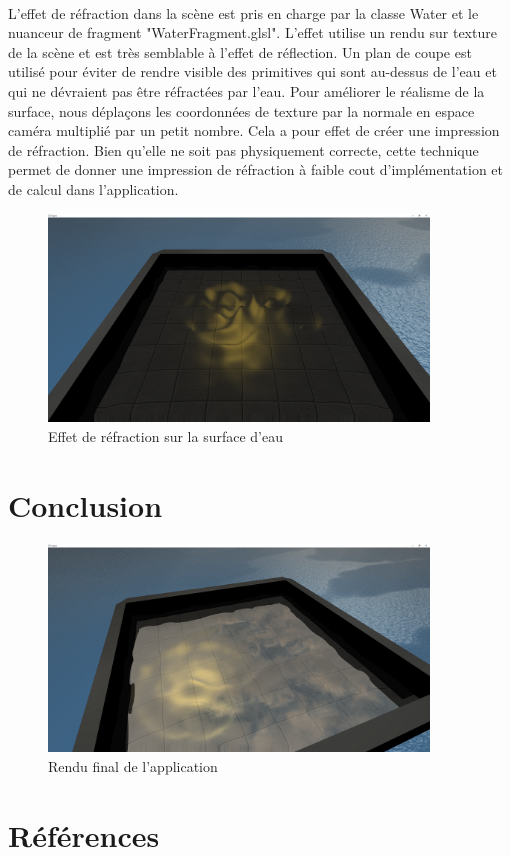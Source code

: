 \documentclass[a4paper, 12pt]{article} %
\begin{document}
	\paragraph{}
	L'effet de réfraction dans la scène est pris en charge par la classe Water et le nuanceur de fragment "WaterFragment.glsl". L'effet utilise un rendu sur 
	texture de la scène et est très semblable à l'effet de réflection. Un plan de coupe est utilisé pour éviter de rendre visible des primitives qui sont au-dessus
	de l'eau et qui ne dévraient pas être réfractées par l'eau. Pour améliorer le réalisme de la surface, nous déplaçons les coordonnées de texture par la normale 
	en espace caméra multiplié par un petit nombre. Cela a pour effet de créer une impression de réfraction. Bien qu'elle ne soit pas physiquement correcte, cette
	technique permet de donner une impression de réfraction à faible cout d'implémentation et de calcul dans l'application.
\begin{figure}
	\centering
	\includegraphics[width=0.9\textwidth]{./PhotoRapport/Refraction.png}
	\caption{Effet de réfraction sur la surface d'eau}
	\label{Refractopm}
\end{figure}
\section{Conclusion}
\begin{figure}
	\centering
	\includegraphics[width=0.9\textwidth]{./PhotoRapport/EffetFinal.png}
	\caption{Rendu final de l'application}
	\label{EffetFinal}
\end{figure}
\section{Références}
\end{document}
